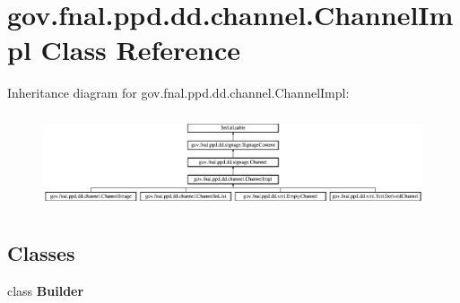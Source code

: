 \hypertarget{classgov_1_1fnal_1_1ppd_1_1dd_1_1channel_1_1ChannelImpl}{\section{gov.\-fnal.\-ppd.\-dd.\-channel.\-Channel\-Impl Class Reference}
\label{classgov_1_1fnal_1_1ppd_1_1dd_1_1channel_1_1ChannelImpl}
}
Inheritance diagram for gov.\-fnal.\-ppd.\-dd.\-channel.\-Channel\-Impl\-:\begin{figure}[H]
\begin{center}
\leavevmode
\includegraphics[height=2.800000cm]{classgov_1_1fnal_1_1ppd_1_1dd_1_1channel_1_1ChannelImpl}
\end{center}
\end{figure}
\subsection*{Classes}
\begin{DoxyCompactItemize}
\item 
class {\bfseries Builder}
\end{DoxyCompactItemize}

